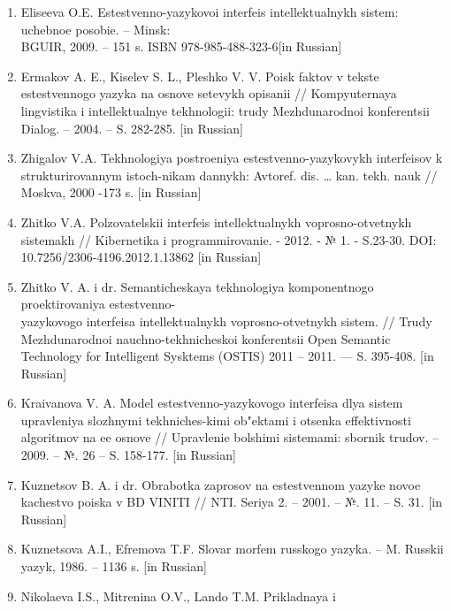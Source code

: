 \begin{noparindent}
\begin{enumerate}
\def\labelenumi{\arabic{enumi}.}
\item
  Eliseeva O.E. Estestvenno-yazykovoi interfeis
  intellektual\textquotesingle nykh sistem: uchebnoe posobie. -- Minsk:
  \\BGUIR, 2009. -- 151 s. ISBN 978-985-488-323-6{[}in Russian{]}
\item
  Ermakov A. E., Kiselev S. L., Pleshko V. V. Poisk faktov v tekste
  estestvennogo yazyka na osnove setevykh opisanii //
  Komp\textquotesingle yuternaya lingvistika i
  intellektual\textquotesingle nye tekhnologii: trudy Mezhdunarodnoi
  konferentsii Dialog. -- 2004. -- S. 282-285. {[}in Russian{]}
\item
  Zhigalov V.A. Tekhnologiya postroeniya estestvenno-yazykovykh
  interfeisov k strukturirovannym istoch-nikam dannykh: Avtoref. dis.
  \ldots{} kan. tekh. nauk // Moskva, 2000 -173 s. {[}in Russian{]}
\item
  Zhitko V.A. Pol\textquotesingle zovatel\textquotesingle skii interfeis
  intellektual\textquotesingle nykh voprosno-otvetnykh sistemakh //
  Kibernetika i programmirovanie. - 2012. - № 1. - S.23-30. DOI:
  10.7256/2306-4196.2012.1.13862 {[}in Russian{]}
\item
  Zhitko V. A. i dr. Semanticheskaya tekhnologiya komponentnogo
  proektirovaniya estestvenno-\\yazykovogo interfeisa intellektual\textquotesingle nykh voprosno-otvetnykh sistem. // Trudy
  Mezhdunarodnoi nauchno-tekhnicheskoi konferentsii Open Semantic
  Technology for Intelligent Sysktems (OSTIS) 2011 -- 2011. --- S.
  395-408. {[}in Russian{]}
\item
  Kraivanova V. A. Model\textquotesingle{} estestvenno-yazykovogo
  interfeisa dlya sistem upravleniya slozhnymi tekhniches-kimi ob"ektami
  i otsenka effektivnosti algoritmov na ee osnove // Upravlenie
  bol\textquotesingle shimi sistemami: sbornik trudov. -- 2009. -- №. 26
  -- S. 158-177. {[}in Russian{]}
\item
  Kuznetsov B. A. i dr. Obrabotka zaprosov na estestvennom yazyke novoe
  kachestvo poiska v BD VINITI // NTI. Seriya 2. -- 2001. -- №. 11. --
  S. 31. {[}in Russian{]}
\item
  Kuznetsova A.I., Efremova T.F. Slovar\textquotesingle{} morfem
  russkogo yazyka. -- M. Russkii yazyk, 1986. -- 1136 s. {[}in
  Russian{]}
\item
  Nikolaeva I.S., Mitrenina O.V., Lando T.M. Prikladnaya i

\end{enumerate}
\end{noparindent}
